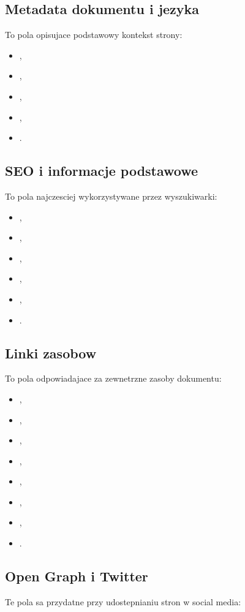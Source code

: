 \subsection*{Metadata dokumentu i jezyka}
To pola opisujace podstawowy kontekst strony:

\begin{itemize}
  \item {},
  \item {},
  \item {},
  \item {},
  \item {}.
\end{itemize}

\subsection*{SEO i informacje podstawowe}
To pola najczesciej wykorzystywane przez wyszukiwarki:

\begin{itemize}
  \item {},
  \item {},
  \item {},
  \item {},
  \item {},
  \item {}.
\end{itemize}

\subsection*{Linki zasobow}
To pola odpowiadajace za zewnetrzne zasoby dokumentu:

\begin{itemize}
  \item {},
  \item {},
  \item {},
  \item {},
  \item {},
  \item {},
  \item {},
  \item {}.
\end{itemize}

\subsection*{Open Graph i Twitter}
Te pola sa przydatne przy udostepnianiu stron w social media:

